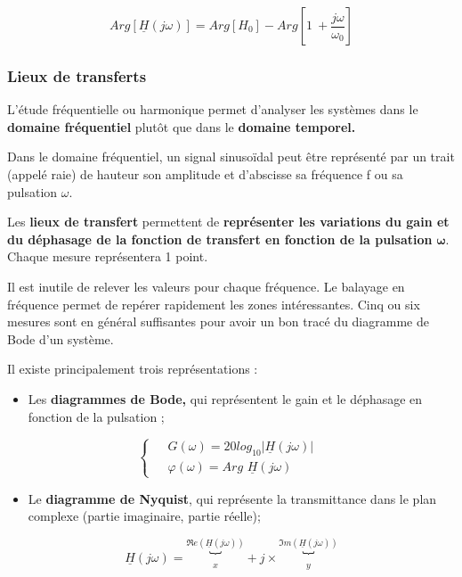 \[Arg\left\lbrack \underline{H}(j\omega) \right\rbrack = Arg\left\lbrack H_{0} \right\rbrack - Arg\left\lbrack 1\  + \frac{j\omega}{\omega_{0}} \right\rbrack\]

\hypertarget{lieux-de-transferts}{%
\subsubsection{Lieux de transferts}\label{lieux-de-transferts}}

L'étude fréquentielle ou harmonique permet d'analyser les systèmes dans le \textbf{domaine fréquentiel} plutôt que dans le \textbf{domaine temporel.}

Dans le domaine fréquentiel, un signal sinusoïdal peut être représenté par un trait (appelé raie) de hauteur son amplitude et d'abscisse sa fréquence f ou sa pulsation \(\omega\).

Les \textbf{lieux de transfert} permettent de \textbf{représenter les variations du gain et du déphasage de la fonction de transfert en fonction de la pulsation} \(\mathbf{\omega}\). Chaque mesure représentera 1 point.

Il est inutile de relever les valeurs pour chaque fréquence. Le balayage en fréquence permet de repérer rapidement les zones intéressantes. Cinq ou six mesures sont en général suffisantes pour avoir un bon tracé du diagramme de Bode d'un système.

Il existe principalement trois représentations :

\begin{itemize}
\item
  Les \textbf{diagrammes de Bode,} qui représentent le gain et le déphasage en fonction de la pulsation ;
\end{itemize}

\[\left\{ \begin{aligned}
 & \mspace{6mu} G(\omega) = 20log_{10}\left| \underline{H}(j\omega) \right|\mspace{6mu} \\
 & \mspace{6mu}\varphi(\omega) = Arg\mspace{6mu}\underline{H}(j\omega)
\end{aligned} \right.\ \]

\begin{itemize}
\item
  Le \textbf{diagramme de Nyquist}, qui représente la transmittance dans le plan complexe (partie imaginaire, partie réelle);
\end{itemize}

\[\underline{H}(j\omega) = \underset{x}{\overset{\mathfrak{R}e(\underline{H}(j\omega))}{︸}} + j \times \underset{y}{\overset{\mathfrak{I}m(\underline{H}(j\omega))}{︸}}\]

